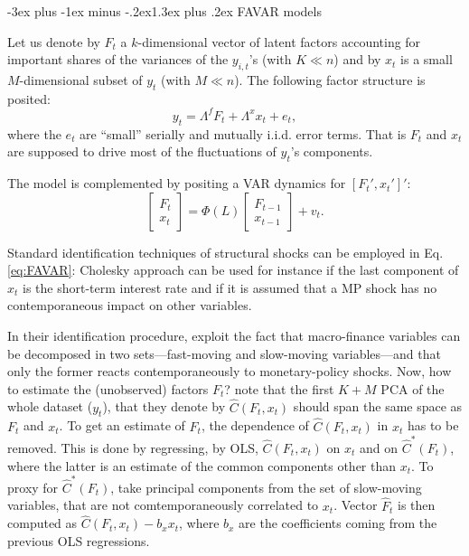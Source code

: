 \documentclass[
  11pt,
]{book}
\makeatletter
\renewcommand\section{\@startsection{section}{1}{\z@}
  {-3ex plus -1ex minus -.2ex}{1.3ex plus .2ex}
  {\normalfont\Large\bfseries\color{TextbookInk}}}
\theoremstyle{definition}
\theoremstyle{definition}
\theoremstyle{definition}
\theoremstyle{definition}
\theoremstyle{remark}
\makeatother
\begin{document}
\section{FAVAR models}\label{favar-models}

Let us denote by \(F_t\) a \(k\)-dimensional vector of latent factors accounting for important shares of the variances of the \(y_{i,t}\)'s (with \(K \ll n\)) and by \(x_t\) is a small \(M\)-dimensional subset of \(y_t\) (with \(M \ll n\)). The following factor structure is posited:
\[
y_t = \Lambda^f F_t + \Lambda^x x_t + e_t,
\]
where the \(e_t\) are ``small'' serially and mutually i.i.d. error terms. That is \(F_t\) and \(x_t\) are supposed to drive most of the fluctuations of \(y_t\)'s components.

The model is complemented by positing a VAR dynamics for \([F_t',x_t']'\):
\begin{equation}
\left[\begin{array}{c}F_t\\x_t\end{array}\right] = \Phi(L)\left[\begin{array}{c}F_{t-1}\\ x_{t-1}\end{array}\right] + v_t.\label{eq:FAVAR}
\end{equation}

Standard identification techniques of structural shocks can be employed in Eq. \eqref{eq:FAVAR}: Cholesky approach can be used for instance if the last component of \(x_t\) is the short-term interest rate and if it is assumed that a MP shock has no contemporaneous impact on other variables.

In their identification procedure, \citet{Bernanke_Boivin_Eliasz_2005} exploit the fact that macro-finance variables can be decomposed in two sets---fast-moving and slow-moving variables---and that only the former reacts contemporaneously to monetary-policy shocks. Now, how to estimate the (unobserved) factors \(F_t\)? \citet{Bernanke_Boivin_Eliasz_2005} note that the first \(K+M\) PCA of the whole dataset (\(y_t\)), that they denote by \(\hat{C}(F_t,x_t)\) should span the same space as \(F_t\) and \(x_t\). To get an estimate of \(F_t\), the dependence of \(\hat{C}(F_t,x_t)\) in \(x_t\) has to be removed. This is done by regressing, by OLS, \(\hat{C}(F_t,x_t)\) on \(x_t\) and on \(\hat{C}^*(F_t)\), where the latter is an estimate of the common components other than \(x_t\). To proxy for \(\hat{C}^*(F_t)\), \citet{Bernanke_Boivin_Eliasz_2005} take principal components from the set of slow-moving variables, that are not comtemporaneously correlated to \(x_t\). Vector \(\hat{F}_t\) is then computed as \(\hat{C}(F_t,x_t) - b_x x_t\), where \(b_x\) are the coefficients coming from the previous OLS regressions.
\end{document}
